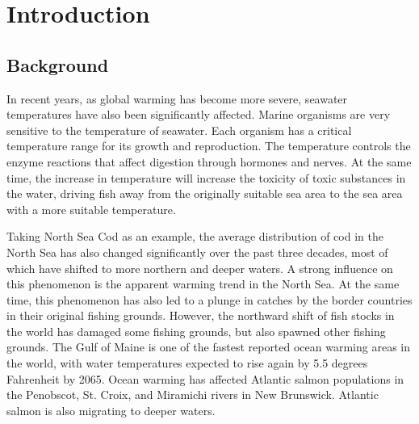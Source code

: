 \documentclass{mcmthesis}
\numberwithin{figure}{section}
\numberwithin{table}{section}
\begin{document}
\newpage

\pagestyle{fancy}

\setcounter{page}{1}
\section{Introduction}
\subsection{Background}

In recent years, as global warming has become more severe, seawater temperatures have also been significantly affected. Marine organisms are very sensitive to the temperature of seawater. Each organism has a critical temperature range for its growth and reproduction. The temperature controls the enzyme reactions that affect digestion through hormones and nerves. At the same time, the increase in temperature will increase the toxicity of toxic substances in the water, driving fish away from the originally suitable sea area to the sea area with a more suitable temperature.\cite{REF1}

Taking North Sea Cod as an example, the average distribution of cod in the North Sea has also changed significantly over the past three decades, most of which have shifted to more northern and deeper waters. A strong influence on this phenomenon is the apparent warming trend in the North Sea. At the same time, this phenomenon has also led to a plunge in catches by the border countries in their original fishing grounds. However, the northward shift of fish stocks in the world has damaged some fishing grounds, but also spawned other fishing grounds.
The Gulf of Maine is one of the fastest reported ocean warming areas in the world, with water temperatures expected to rise again by 5.5 degrees Fahrenheit by 2065. Ocean warming has affected Atlantic salmon populations in the Penobscot, St. Croix, and Miramichi rivers in New Brunswick. Atlantic salmon is also migrating to deeper waters.\cite{REF2} 
\end{document}
